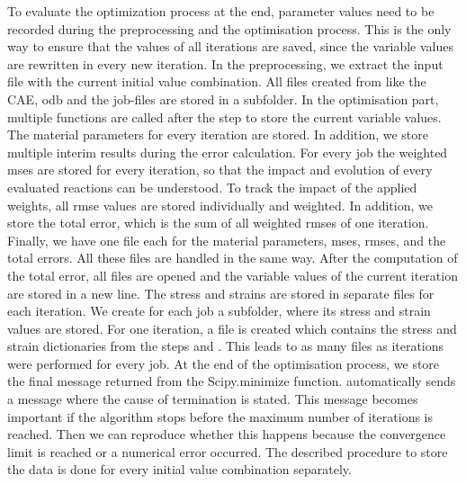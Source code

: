 To evaluate the optimization process at the end, parameter values need to be recorded during the preprocessing and the optimisation process. This is the only way to ensure that the values of all iterations are saved, since the variable values are rewritten in every new iteration. In the preprocessing, we extract the input file with the current initial value combination. All files created from  like the CAE, \acrshort{odb} and the job-files are stored in a subfolder. In the optimisation part, multiple functions are called after the step  to store the current variable values. The material parameters for every iteration are stored. In addition, we store multiple interim results during the error calculation. For every job the weighted \acrshort{mse}s are stored for every iteration, so that the impact and evolution of every evaluated reactions can be understood. To track the impact of the applied weights, all \acrshort{rmse} values are stored individually and weighted. In addition, we store the total error, which is the sum of all weighted \acrshort{rmse}s of one iteration. Finally, we have one file each for the material parameters, \acrshort{mse}s, \acrshort{rmse}s, and the total errors. All these files are handled in the same way. After the computation of the total error, all files are opened and the variable values of the current iteration are stored in a new line. The stress and strains are stored in separate files for each iteration. We create for each job a subfolder, where its stress and strain values are stored. For one iteration, a file is created which contains the stress and strain dictionaries from the steps  and . This leads to as many files as iterations were performed for every job. At the end of the optimisation process, we store the final message returned from the Scipy.minimize function.  automatically sends a message where the cause of termination is stated. This message becomes important if the algorithm stops before the maximum number of iterations is reached. Then we can reproduce whether this happens because the convergence limit is reached or a numerical error occurred. The described procedure to store the data is done for every initial value combination separately.

